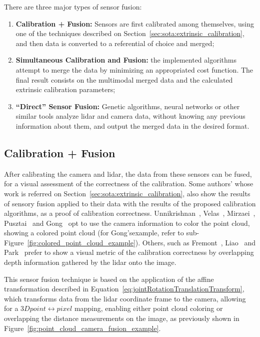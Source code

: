 There are three major types of sensor fusion: 

\begin{enumerate}
	\item \textbf{Calibration + Fusion:} Sensors are first calibrated among themselves, using one of the techniques described on Section~\ref{sec:sota:extrinsic_calibration}, and then data is converted to a referential of choice and merged;
	\item \textbf{Simultaneous Calibration and Fusion:} the implemented algorithms attempt to merge the data by minimizing an appropriated cost function. The final result consists on the multimodal merged data and the calculated extrinsic calibration parameters;
	\item \textbf{``Direct'' Sensor Fusion:} Genetic algorithms, neural networks or other similar tools analyze \ac{lidar} and camera data, without knowing any previous information about them, and output the merged data in the desired format.
\end{enumerate} 


\subsection{Calibration + Fusion}
\label{subsec:sota:calibration-and-fusion}
After calibrating the camera and \ac{lidar}, the data from these sensors can be fused, for a visual assessment of the correctness of the calibration. Some authors' whose work is referred on Section~\ref{sec:sota:extrinsic_calibration}, also show the results of sensory fusion applied to their data with the results of the proposed calibration algorithms, as a proof of calibration correctness. Unnikrishnan\etal~\cite{Unnikrishnan2005}, Velas\etal~\cite{MartinVelas2013}, Mirzaei\etal~\cite{Mirzaei2012}, Pusztai\etal~\cite{Pusztai2018} and Gong\etal~\cite{Gong2013} opt to use the camera information to color the point cloud, showing a colored point cloud (for Gong's\etal example, refer to sub-Figure~\ref{fig:colored_point_cloud_example}). Others, such as Fremont\etal~\cite{Fremont2013}, Liao\etal~\cite{Liao2019} and Park\etal~\cite{Park2014} prefer to show a visual metric of the calibration correctness by overlapping depth information gathered by the \ac{lidar} onto the image.

This sensor fusion technique is based on the application of the affine transformation described in Equation~\eqref{eq:jointRotationTranslationTransform}, which transforms data from the \ac{lidar} coordinate frame to the camera, allowing for a $3D point \leftrightarrow pixel$ mapping, enabling either point cloud coloring or overlapping the distance measurements on the image, as previously shown in Figure~\ref{fig:point_cloud_camera_fusion_example}.
	
